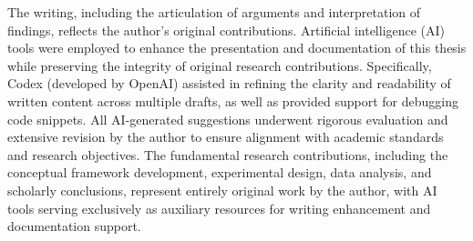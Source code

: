 The writing, including the articulation of arguments and interpretation of findings, reflects the author’s original contributions. Artificial intelligence (AI) tools were employed to enhance the presentation and documentation of this thesis while preserving the integrity of original research
contributions. Specifically, Codex (developed by OpenAI) assisted in refining the clarity
and readability of written content across multiple drafts, as well as provided support for debugging code snippets. All AI-generated suggestions underwent rigorous evaluation and extensive revision by the author to ensure alignment with academic standards and research objectives. The fundamental research contributions, including the conceptual framework development, experimental design, data analysis, and scholarly conclusions, represent entirely original work by the author, with AI tools serving exclusively as auxiliary resources for writing enhancement and documentation support.




